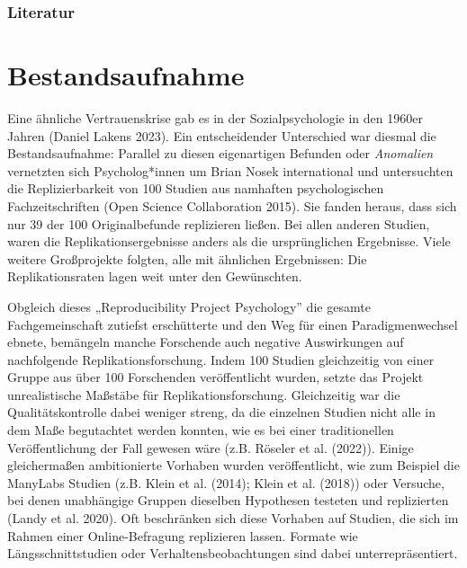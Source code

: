 \documentclass[
  letterpaper,
  DIV=11,
  numbers=noendperiod]{scrreprt}
\begin{document}
\subsection{Literatur}\label{literatur-4}

\chapter{Bestandsaufnahme}\label{bestandsaufnahme}

Eine ähnliche Vertrauenskrise gab es in der Sozialpsychologie in den
1960er Jahren (Daniel Lakens 2023). Ein entscheidender Unterschied war
diesmal die Bestandsaufnahme: Parallel zu diesen eigenartigen Befunden
oder \emph{Anomalien} vernetzten sich Psycholog*innen um Brian Nosek
international und untersuchten die Replizierbarkeit von 100 Studien aus
namhaften psychologischen Fachzeitschriften (Open Science Collaboration
2015). Sie fanden heraus, dass sich nur 39 der 100 Originalbefunde
replizieren ließen. Bei allen anderen Studien, waren die
Replikationsergebnisse anders als die ursprünglichen Ergebnisse. Viele
weitere Großprojekte folgten, alle mit ähnlichen Ergebnissen: Die
Replikationsraten lagen weit unter den Gewünschten.

\begin{tcolorbox}[enhanced jigsaw, title=\textcolor{quarto-callout-note-color}{\faInfo}\hspace{0.5em}{Kritische Betrachtung der Open Science Collaboration, 2015}, colbacktitle=quarto-callout-note-color!10!white, rightrule=.15mm, titlerule=0mm, left=2mm, bottomrule=.15mm, arc=.35mm, leftrule=.75mm, toprule=.15mm, opacityback=0, breakable, bottomtitle=1mm, colframe=quarto-callout-note-color-frame, toptitle=1mm, opacitybacktitle=0.6, coltitle=black, colback=white]

Obgleich dieses „Reproducibility Project Psychology'' die gesamte
Fachgemeinschaft zutiefst erschütterte und den Weg für einen
Paradigmenwechsel ebnete, bemängeln manche Forschende auch negative
Auswirkungen auf nachfolgende Replikationsforschung. Indem 100 Studien
gleichzeitig von einer Gruppe aus über 100 Forschenden veröffentlicht
wurden, setzte das Projekt unrealistische Maßstäbe für
Replikationsforschung. Gleichzeitig war die Qualitätskontrolle dabei
weniger streng, da die einzelnen Studien nicht alle in dem Maße
begutachtet werden konnten, wie es bei einer traditionellen
Veröffentlichung der Fall gewesen wäre (z.B. Röseler et al. (2022)).
Einige gleichermaßen ambitionierte Vorhaben wurden veröffentlicht, wie
zum Beispiel die ManyLabs Studien (z.B. Klein et al. (2014); Klein et
al. (2018)) oder Versuche, bei denen unabhängige Gruppen dieselben
Hypothesen testeten und replizierten (Landy et al. 2020). Oft
beschränken sich diese Vorhaben auf Studien, die sich im Rahmen einer
Online-Befragung replizieren lassen. Formate wie Längsschnittstudien
oder Verhaltensbeobachtungen sind dabei unterrepräsentiert.

\end{tcolorbox}
\end{document}
